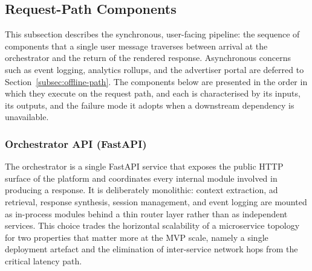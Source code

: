 

\subsection{Request-Path Components}
\label{subsec:request-path}

This subsection describes the synchronous, user-facing pipeline: the
sequence of components that a single user message traverses between arrival at the orchestrator and the
return of the rendered response. Asynchronous concerns such as event
logging, analytics rollups, and the advertiser portal are deferred to
Section~\ref{subsec:offline-path}. The components below are presented
in the order in which they execute on the request path, and each is
characterised by its inputs, its outputs, and the failure mode it
adopts when a downstream dependency is unavailable.

\subsubsection{Orchestrator API (FastAPI)}
\label{subsubsec:orchestrator}

The orchestrator is a single FastAPI service that exposes the public
HTTP surface of the platform and coordinates every internal module
involved in producing a response. It is deliberately monolithic:
context extraction, ad retrieval, response synthesis, session
management, and event logging are mounted as in-process modules behind
a thin router layer rather than as independent services. This choice
trades the horizontal scalability of a microservice topology for two
properties that matter more at the MVP scale, namely a single
deployment artefact and the elimination of inter-service network hops
from the critical latency path.

